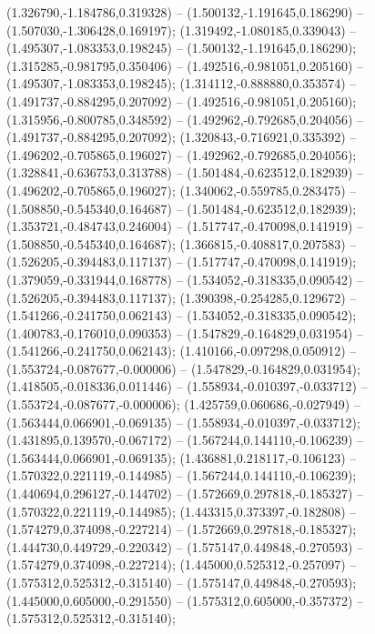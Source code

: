  (1.326790,-1.184786,0.319328) -- (1.500132,-1.191645,0.186290) -- (1.507030,-1.306428,0.169197);
 (1.319492,-1.080185,0.339043) -- (1.495307,-1.083353,0.198245) -- (1.500132,-1.191645,0.186290);
 (1.315285,-0.981795,0.350406) -- (1.492516,-0.981051,0.205160) -- (1.495307,-1.083353,0.198245);
 (1.314112,-0.888880,0.353574) -- (1.491737,-0.884295,0.207092) -- (1.492516,-0.981051,0.205160);
 (1.315956,-0.800785,0.348592) -- (1.492962,-0.792685,0.204056) -- (1.491737,-0.884295,0.207092);
 (1.320843,-0.716921,0.335392) -- (1.496202,-0.705865,0.196027) -- (1.492962,-0.792685,0.204056);
 (1.328841,-0.636753,0.313788) -- (1.501484,-0.623512,0.182939) -- (1.496202,-0.705865,0.196027);
 (1.340062,-0.559785,0.283475) -- (1.508850,-0.545340,0.164687) -- (1.501484,-0.623512,0.182939);
 (1.353721,-0.484743,0.246004) -- (1.517747,-0.470098,0.141919) -- (1.508850,-0.545340,0.164687);
 (1.366815,-0.408817,0.207583) -- (1.526205,-0.394483,0.117137) -- (1.517747,-0.470098,0.141919);
 (1.379059,-0.331944,0.168778) -- (1.534052,-0.318335,0.090542) -- (1.526205,-0.394483,0.117137);
 (1.390398,-0.254285,0.129672) -- (1.541266,-0.241750,0.062143) -- (1.534052,-0.318335,0.090542);
 (1.400783,-0.176010,0.090353) -- (1.547829,-0.164829,0.031954) -- (1.541266,-0.241750,0.062143);
 (1.410166,-0.097298,0.050912) -- (1.553724,-0.087677,-0.000006) -- (1.547829,-0.164829,0.031954);
 (1.418505,-0.018336,0.011446) -- (1.558934,-0.010397,-0.033712) -- (1.553724,-0.087677,-0.000006);
 (1.425759,0.060686,-0.027949) -- (1.563444,0.066901,-0.069135) -- (1.558934,-0.010397,-0.033712);
 (1.431895,0.139570,-0.067172) -- (1.567244,0.144110,-0.106239) -- (1.563444,0.066901,-0.069135);
 (1.436881,0.218117,-0.106123) -- (1.570322,0.221119,-0.144985) -- (1.567244,0.144110,-0.106239);
 (1.440694,0.296127,-0.144702) -- (1.572669,0.297818,-0.185327) -- (1.570322,0.221119,-0.144985);
 (1.443315,0.373397,-0.182808) -- (1.574279,0.374098,-0.227214) -- (1.572669,0.297818,-0.185327);
 (1.444730,0.449729,-0.220342) -- (1.575147,0.449848,-0.270593) -- (1.574279,0.374098,-0.227214);
 (1.445000,0.525312,-0.257097) -- (1.575312,0.525312,-0.315140) -- (1.575147,0.449848,-0.270593);
 (1.445000,0.605000,-0.291550) -- (1.575312,0.605000,-0.357372) -- (1.575312,0.525312,-0.315140);
